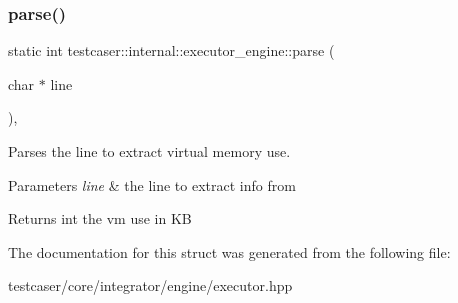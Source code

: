 \subsubsection{\texorpdfstring{parse()}{parse()}}
{\footnotesize\ttfamily static int testcaser\+::internal\+::executor\+\_\+engine\+::parse (\begin{DoxyParamCaption}\item[{char $\ast$}]{line }\end{DoxyParamCaption})\hspace{0.3cm}{\ttfamily [inline]}, {\ttfamily [static]}}



Parses the line to extract virtual memory use. 


\begin{DoxyParams}{Parameters}
{\em line} & the line to extract info from \\
\hline
\end{DoxyParams}
\begin{DoxyReturn}{Returns}
int the vm use in KB 
\end{DoxyReturn}


The documentation for this struct was generated from the following file\+:\begin{DoxyCompactItemize}
\item 
testcaser/core/integrator/engine/executor.\+hpp\end{DoxyCompactItemize}
